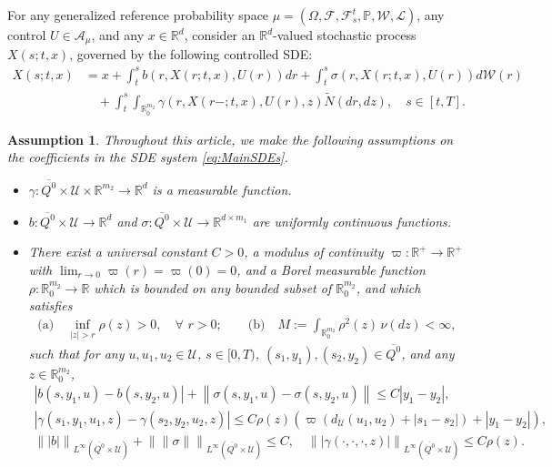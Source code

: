 \documentclass[amscd,amssymb,11pt]{article}
\newtheorem{assumption}[theorem]{Assumption}
\numberwithin{theorem}{section}
\numberwithin{equation}{section}
\begin{document}
For any generalized reference probability space $\mu=(\Omega,\mathscr{F},\mathscr{F}_{s}^{t},\mathbb{P},\mathcal{W},\mathcal{L})$, any control $U\in\mathcal{A}_{\mu}$, and any $x\in\mathbb{R}^{d}$, consider an $\mathbb{R}^{d}$-valued stochastic process $X(s;t,x)$, governed by the following controlled SDE:
\begin{align}\label{eq:MainSDEs}
X(s;t,x)&=x+\int_{t}^{s}b\left(r,X(r;t,x),U(r)\right)dr+\int_{t}^{s}\sigma\!\left(r,X(r;t,x),U(r)\right)d\mathcal{W}(r)\nonumber\\
&\quad +\int_{t}^{s}\int_{\mathbb{R}^{m_{2}}_{0}}\gamma\left(r,X(r-;t,x),U(r),z\right)\widetilde{N}(dr,dz),\quad s\in[t,T].
\end{align}
\begin{assumption}\label{assump:SDECoefs}
Throughout this article, we make the following assumptions on the coefficients in the SDE system \eqref{eq:MainSDEs}.
\begin{itemize}
\item [(i)] $\gamma:\overline{Q^{0}}\times\mathcal{U}\times\mathbb{R}^{m_{2}}\rightarrow\mathbb{R}^{d}$ is a measurable function.
\item [(ii)] $b:\overline{Q^{0}}\times\mathcal{U}\rightarrow\mathbb{R}^{d}$ and $\sigma:\overline{Q^{0}}\times\mathcal{U}\rightarrow\mathbb{R}^{d\times m_{1}}$ are uniformly continuous functions.
\item [(iii)] There exist a universal constant $C>0$, a modulus of continuity $\varpi:\mathbb{R}^{+}\rightarrow\mathbb{R}^{+}$ with $\lim_{r\rightarrow 0}\varpi(r)=\varpi(0)=0$, and a Borel measurable function $\rho:\mathbb{R}^{m_{2}}_{0}\rightarrow\mathbb{R}$ which is bounded on any bounded subset of $\mathbb{R}^{m_{2}}_{0}$, and which satisfies
    \begin{align*}
    \text{(a)}\quad\inf_{|z|>r}\rho(z)>0,\quad\forall\,\,r>0;\qquad\text{(b)}\quad M:=\int_{\mathbb{R}^{m_{2}}_{0}}\rho^{2}(z)\,\nu(dz)<\infty,
    \end{align*}
    such that for any $u,u_{1},u_{2}\in\mathcal{U}$, $s\in[0,T)$, $(s_{1},y_{1}),(s_{2},y_{2})\in \overline{Q^{0}}$, and any $z\in\mathbb{R}^{m_{2}}_{0}$,
    \begin{align}
    \left|b(s,y_{1},u)-b(s,y_{2},u)\right|+\left\|\sigma(s,y_{1},u)-\sigma(s,y_{2},u)\right\|\leq C\left|y_{1}-y_{2}\right|,\qquad\quad\,\,\nonumber\\
    \left|\gamma(s_{1},y_{1},u_{1},z)-\gamma(s_{2},y_{2},u_{2},z)\right |\leq C\rho(z)\left(\varpi\!\left(d_{\mathcal{U}}(u_{1},u_{2})+\left|s_{1}-s_{2}\right|\right)+\left|y_{1}-y_{2}\right|\right),\nonumber\\
    \label{eq:inftybounds} \left\||b|\right\|_{L^{\infty}(\overline{Q^{0}}\times\mathcal{U})}+\left\|\|\sigma\|\right\|_{L^{\infty}(\overline{Q^{0}}\times\mathcal{U})}\leq C,\quad\left\||\gamma(\cdot,\cdot,\cdot,z)|\right\|_{L^{\infty}(\overline{Q^{0}}\times\mathcal{U})}\leq C\rho(z).\quad\,\,\,\,
    \end{align}
\end{itemize}
\end{assumption}
\end{document}
